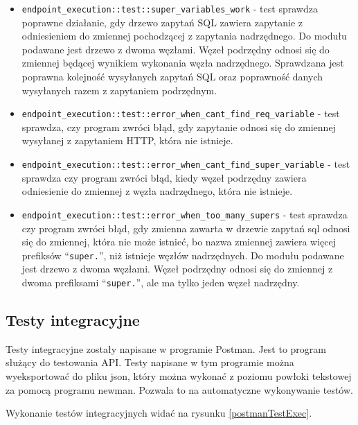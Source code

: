 \begin{itemize}
    \item \verb|endpoint_execution::test::super_variables_work| - test sprawdza
        poprawne działanie, gdy drzewo zapytań SQL zawiera zapytanie z
        odniesieniem do zmiennej pochodzącej z zapytania nadrzędnego. Do modułu
        podawane jest drzewo z dwoma węzłami. Węzeł podrzędny odnosi się do
        zmiennej będącej wynikiem wykonania węzła nadrzędnego. Sprawdzana jest
        poprawna kolejność wysyłanych zapytań SQL oraz poprawność danych
        wysyłanych razem z zapytaniem podrzędnym.

    \item \verb|endpoint_execution::test::error_when_cant_find_req_variable| -
        test sprawdza, czy program zwróci błąd, gdy zapytanie odnosi się do
        zmiennej wysyłanej z zapytaniem HTTP, która nie istnieje.

    \item \verb|endpoint_execution::test::error_when_cant_find_super_variable| -
        test sprawdza czy program zwróci błąd, kiedy węzeł podrzędny zawiera
        odniesienie do zmiennej z węzła nadrzędnego, która nie istnieje.

    \item \verb|endpoint_execution::test::error_when_too_many_supers| - test
        sprawdza czy program zwróci błąd, gdy zmienna zawarta w drzewie zapytań
        sql odnosi się do zmiennej, która nie może istnieć, bo nazwa zmiennej
        zawiera więcej prefiksów ``\verb|super.|'', niż istnieje węzłów
        nadrzędnych. Do modułu podawane jest drzewo z dwoma węzłami. Węzeł
        podrzędny odnosi się do zmiennej z dwoma prefiksami ``\verb|super.|'',
        ale ma tylko jeden węzeł nadrzędny.

\end{itemize}

\subsection{Testy integracyjne}

Testy integracyjne zostały napisane w programie Postman. Jest to program służący
do testowania API. Testy napisane w tym programie można wyeksportować do pliku
json, który można wykonać z poziomu powłoki tekstowej za pomocą programu
newman. Pozwala to na automatyczne wykonywanie testów.

Wykonanie testów integracyjnych widać na rysunku \ref{postmanTestExec}.

